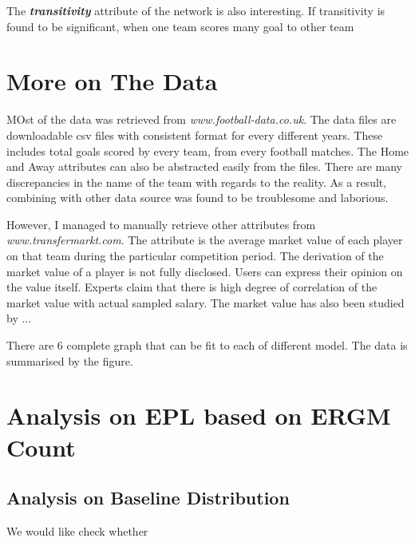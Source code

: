 \documentclass[12pt,a4paper,twoside,openany]{book}\usepackage[]{graphicx}\usepackage[]{color}
\newcommand{\BI}[1]{\textit{\textbf{#1}}}
\begin{document}
The \BI{transitivity} attribute of the network is also interesting. 
If transitivity is found to be significant, when one team scores many goal to other team  

\section{More on The Data}
MOst of the data was retrieved from \textit{www.football-data.co.uk}.
The data files are downloadable csv files with consistent format for every different years.
These includes total goals scored by every team, from every football matches. 
The Home and Away attributes can also be abstracted easily from the files. 
There are many discrepancies in the name of the team with regards to the reality.
As a result, combining with other data source was found to be troublesome and laborious.

However, I managed to manually retrieve other attributes from \textit{www.transfermarkt.com}.
The attribute is the average market value of each player on that team during the particular competition period. 
The derivation of the market value of a player is not fully disclosed.
Users can express their opinion on the value itself.
Experts claim that there is high degree of correlation of the market value with actual sampled salary.
The market value has also been studied by ...

There are 6 complete graph that can be fit to each of different model. The data is summarised by the figure.

\section{Analysis on EPL based on ERGM Count}
\subsection{Analysis on Baseline Distribution}
We would like check whether 




{}



\end{document}
